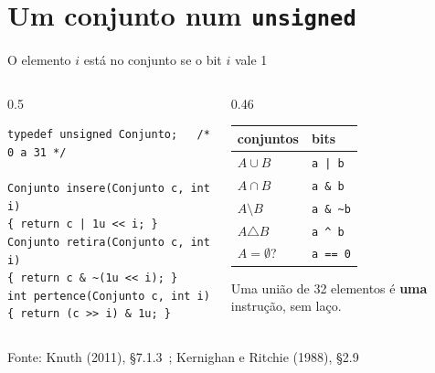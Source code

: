 \documentclass[aspectratio=169]{beamer}
\newcommand{\til}{\textasciitilde}
\newcommand{\cir}{\textasciicircum}
\newcommand{\bits}[3]{%
  \foreach \b [count=\k from 0] in {#3} {
    \node[bit\b] at (#1+0.42*\k, #2) {\b};
  }
}
\newcommand{\fonte}[1]{\vfill\hfill{\scriptsize\textcolor{UFSGray}{Fonte: #1}}}
\begin{document}
\section{Um conjunto num \texttt{unsigned}}

\begin{frame}[fragile]{O elemento $i$ está no conjunto se o bit $i$ vale 1}
  \begin{columns}[c]
    \begin{column}{0.5\textwidth}
\begin{lstlisting}[style=codC]
typedef unsigned Conjunto;   /* 0 a 31 */

Conjunto insere(Conjunto c, int i)
{ return c | 1u << i; }
Conjunto retira(Conjunto c, int i)
{ return c & ~(1u << i); }
int pertence(Conjunto c, int i)
{ return (c >> i) & 1u; }
\end{lstlisting}
      \begin{center}
      \end{center}
    \end{column}
    \begin{column}{0.46\textwidth}
      \small
      \begin{tabular}{@{}ll@{}}
        \toprule
        conjuntos & bits\\
        \midrule
        $A \cup B$       & \texttt{a | b}\\
        $A \cap B$       & \texttt{a \& b}\\
        $A \setminus B$  & \texttt{a \& \til b}\\
        $A \triangle B$  & \texttt{a \cir{} b}\\
        $A = \emptyset$? & \texttt{a == 0}\\
        \bottomrule
      \end{tabular}

      \medskip
      Uma união de 32 elementos é \textbf{uma} instrução, sem laço.
    \end{column}
  \end{columns}
  \fonte{Knuth (2011), §7.1.3~\cite{knuth2011art};
    Kernighan e Ritchie (1988), §2.9~\cite{kernighan1988c}}
\end{frame}
\end{document}
